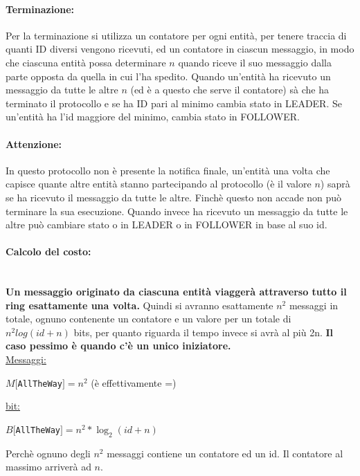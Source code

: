 \paragraph{Terminazione:} Per la terminazione si utilizza un contatore per ogni
entità, per tenere traccia di quanti ID diversi vengono ricevuti, ed un
contatore in ciascun messaggio, in modo che ciascuna entità possa determinare
$n$ quando riceve il suo messaggio dalla parte opposta da quella in cui l'ha
spedito. Quando un'entità ha ricevuto un messaggio da tutte le altre $n$ (ed è a
questo che serve il contatore) sà che ha terminato il protocollo e se ha ID pari
al minimo cambia stato in LEADER. Se un'entità ha l'id maggiore del minimo,
cambia stato in FOLLOWER.

\paragraph{Attenzione:} In questo protocollo non è presente la notifica finale,
un'entità una volta che capisce quante altre entità stanno partecipando al
protocollo (è il valore $n$) saprà se ha ricevuto il messaggio da tutte le
altre. Finchè questo non accade non può terminare la sua esecuzione. Quando
invece ha ricevuto un messaggio da tutte le altre può cambiare stato o in LEADER
o in FOLLOWER in base al suo id.

\paragraph{Calcolo del costo:}\ \\
\textbf{Un messaggio originato da ciascuna entità
    viaggerà attraverso tutto il ring esattamente una volta.} Quindi si avranno
esattamente $n^2$ messaggi in totale, ognuno contenente un contatore e un valore
per un totale di $n^2log(id+n)$ bits, per quanto riguarda il tempo invece si
avrà al più 2n. \textbf{Il caso pessimo è quando c'è un unico iniziatore.}\\
\underline{Messaggi:}
\begin{center}
    $M[$\texttt{AllTheWay}$] = n^2$ (è effettivamente =)
\end{center}
\underline{bit:}
\begin{center}
    $B[$\texttt{AllTheWay}$] = n^2*\log_2(id+n)$
\end{center}

Perchè ognuno degli $n^2$ messaggi contiene un contatore ed un id. Il contatore
al massimo arriverà ad $n$.


